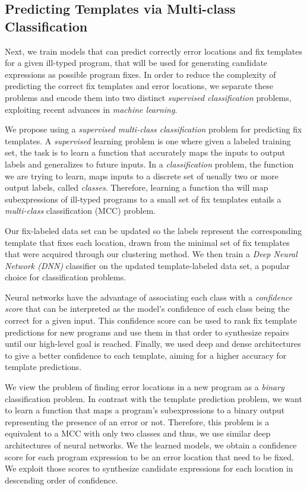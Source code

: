 \subsection{Predicting Templates via Multi-class Classification}
\label{sec:overview:predict}

Next, we train models that can predict correctly error locations and fix
templates for a given ill-typed program, that will be used for generating
candidate expressions as possible program fixes. In order to reduce the
complexity of predicting the correct fix templates and error locations, we
separate these problems and encode them into two distinct \emph{supervised
classification} problems, exploiting recent advances in \emph{machine learning}.

We propose using a \emph{supervised multi-class classification} problem for
predicting fix templates. A \emph{supervised} learning problem is one where
given a labeled training set, the task is to learn a function that accurately
maps the inputs to output labels and generalizes to future inputs. In a
\emph{classification} problem, the function we are trying to learn, maps inputs
to a discrete set of usually two or more output labels, called \emph{classes}.
Therefore, learning a function tha will map subexpressions of ill-typed programs
to a small set of fix templates entails a \emph{multi-class} classification
(MCC) problem.

Our fix-labeled data set can be updated so the labels represent the
corresponding template that fixes each location, drawn from the minimal set of
fix templates that were acquired through our clustering method. We then train a
\emph{Deep Neural Network (DNN)} classifier on the updated template-labeled data
set, a popular choice for classification problems.

Neural networks have the advantage of associating each class with a
\emph{confidence score} that can be interpreted as the model's confidence of
each class being the correct for a given input. This confidence score can be
used to rank fix template predictions for new programs and use them in that
order to synthesize repairs until our high-level goal is reached. Finally, we
used deep and dense architectures to give a better confidence to each template,
aiming for a higher accuracy for template predictions.

 We view the problem of finding error locations in a
new program as a \emph{binary} classification problem. In contrast with the
template prediction problem, we want to learn a function that maps a program's
subexpressions to a binary output representing the presence of an error or not.
Therefore, this problem is a equivalent to a MCC with only two classes and thus,
we use similar deep architectures of neural networks. We the learned models, we
obtain a confidence score for each program expression to be an error location
that need to be fixed. We exploit those scores to synthesize candidate
expressions for each location in descending order of confidence.

